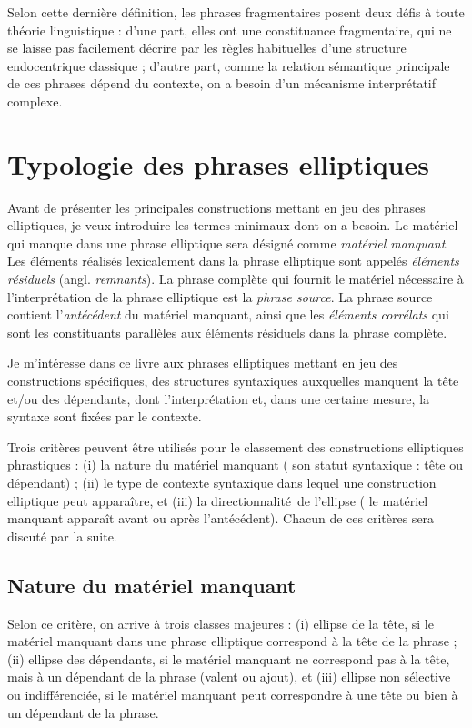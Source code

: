 Selon cette dernière définition, les phrases fragmentaires posent deux défis à toute théorie linguistique : d’une part, elles ont une constituance fragmentaire, qui ne se laisse pas facilement décrire par les règles habituelles d’une structure endocentrique classique ; d’autre part, comme la relation sémantique principale de ces phrases dépend du contexte, on a besoin d’un mécanisme interprétatif complexe.


\section{Typologie des phrases elliptiques} \label{ch1:sect1.4}

Avant de présenter les principales constructions mettant en jeu des phrases elliptiques, je veux introduire les termes minimaux dont on a besoin. Le matériel qui manque dans une phrase elliptique sera désigné comme \textit{matériel manquant}. Les éléments réalisés lexicalement dans la phrase elliptique sont appelés \textit{éléments résiduels} (angl. \textit{remnants}). La phrase complète qui fournit le matériel nécessaire à l’interprétation de la phrase elliptique est la \textit{phrase source}. La phrase source contient l’\textit{antécédent} du matériel manquant, ainsi que les \textit{éléments corrélats} qui sont les constituants parallèles aux éléments résiduels dans la phrase complète.  

Je m’intéresse dans ce livre aux phrases elliptiques mettant en jeu des constructions spécifiques, {\cad} des structures syntaxiques auxquelles manquent la tête et/ou des dépendants, dont l’interprétation et, dans une certaine mesure, la syntaxe sont fixées par le contexte. 

Trois critères peuvent être utilisés pour le classement des constructions elliptiques phrastiques : (i) la nature du matériel manquant ({\cad} son statut syntaxique : tête ou dépendant) ; (ii) le type de contexte syntaxique dans lequel une construction elliptique peut apparaître, et (iii) la directionnalité~de l’ellipse ({\cad} le matériel manquant apparaît avant ou après l’antécédent). Chacun de ces critères sera discuté par la suite.


\subsection{Nature du matériel manquant} \label{ch1:sect1.4.1} 

Selon ce critère, on arrive à trois classes majeures : (i) ellipse de la tête, si le matériel manquant dans une phrase elliptique correspond à la tête de la {phrase ;} (ii) ellipse des dépendants, si le matériel manquant ne correspond pas à la tête, mais à un dépendant de la phrase (valent ou ajout), et (iii) ellipse non sélective ou indifférenciée, si le matériel manquant peut correspondre à une tête ou bien à un dépendant de la phrase. 

